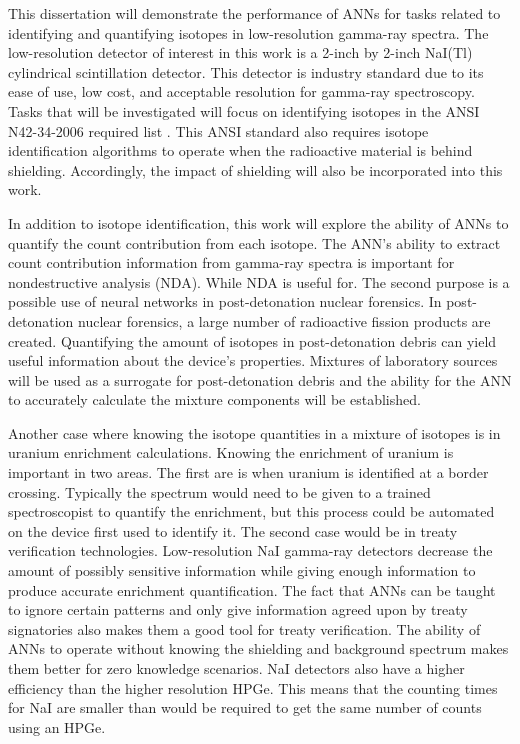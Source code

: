 \documentclass[tocnosub,noragright,centerchapter,12pt,fullpage]{uiucecethesis09}
\begin{document}
This dissertation will demonstrate the performance of ANNs for tasks related to identifying and quantifying isotopes in low-resolution gamma-ray spectra. The low-resolution detector of interest in this work is a 2-inch by 2-inch NaI(Tl) cylindrical scintillation detector. This detector is industry standard due to its ease of use, low cost, and acceptable resolution for gamma-ray spectroscopy. Tasks that will be investigated will focus on identifying isotopes in the ANSI N42-34-2006 required list \cite{ANSI}. This ANSI standard also requires isotope identification algorithms to operate when the radioactive material is behind shielding. Accordingly, the impact of shielding will also be incorporated into this work. 

In addition to isotope identification, this work will explore the ability of ANNs to quantify the count contribution from each isotope. The ANN's ability to extract count contribution information from gamma-ray spectra is important for nondestructive analysis (NDA). While NDA is useful for. The second purpose is a possible use of neural networks in post-detonation nuclear forensics. In post-detonation nuclear forensics, a large number of radioactive fission products are created. Quantifying the amount of isotopes in post-detonation debris can yield useful information about the device's properties. Mixtures of laboratory sources will be used as a surrogate for post-detonation debris and the ability for the ANN to accurately calculate the mixture components will be established.   

Another case where knowing the isotope quantities in a mixture of isotopes is in uranium enrichment calculations. Knowing the enrichment of uranium is important in two areas. The first are is when uranium is identified at a border crossing. Typically the spectrum would need to be given to a trained spectroscopist to quantify the enrichment, but this process could be automated on the device first used to identify it. The second case would be in treaty verification technologies. Low-resolution NaI gamma-ray detectors decrease the amount of possibly sensitive information while giving enough information to produce accurate enrichment quantification. The fact that ANNs can be taught to ignore certain patterns and only give information agreed upon by treaty signatories also makes them a good tool for treaty verification. The ability of ANNs to operate without knowing the shielding and background spectrum makes them better for zero knowledge scenarios. NaI detectors also have a higher efficiency than the higher resolution HPGe. This means that the counting times for NaI are smaller than would be required to get the same number of counts using an HPGe. 
\end{document}
